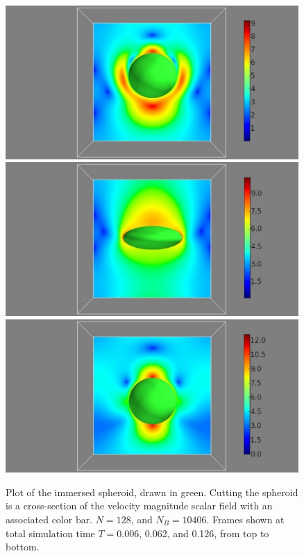 \documentclass[preprint,12pt]{elsarticle}
\begin{document}
 \begin{figure}[htb]
	\begin{center}
		\includegraphics[bb=.0in .4in 11.5in 6.1in,width=4.4in,clip]{SpherePlot_3c.pdf}
		\hfill
		\includegraphics[bb=.0in .4in 11.5in 6.1in,width=4.4in,clip]{SpherePlot_31c.pdf}
		\hfill
		\includegraphics[bb=.0in .4in 11.5in 6.1in,width=4.4in,clip]{SpherePlot_63c.pdf}
	\end{center}
	\caption{\small Plot of the immersed spheroid, drawn in green. Cutting the spheroid is a cross-section of the velocity magnitude scalar field with an associated color bar. $N=128$, and $N_B=10406$. Frames shown at total simulation time $T=0.006$, 0.062, and 0.126, from top to bottom.}
\label{fig:TimeProgression_Sphere}
\end{figure}
\end{document}
